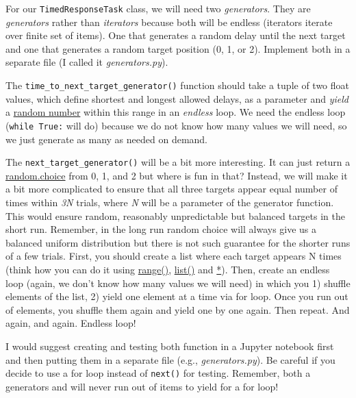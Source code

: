 \documentclass[
]{book}
\begin{document}
For our \texttt{TimedResponseTask} class, we will need two \emph{generators}. They are \emph{generators} rather than \emph{iterators} because both will be endless (iterators iterate over finite set of items). One that generates a random delay until the next target and one that generates a random target position (0, 1, or 2). Implement both in a separate file (I called it \emph{generators.py}).

The \texttt{time\_to\_next\_target\_generator()} function should take a tuple of two float values, which define shortest and longest allowed delays, as a parameter and \emph{yield} a \href{https://docs.python.org/3/library/random.html\#random.uniform}{random number} within this range in an \emph{endless} loop. We need the endless loop (\texttt{while\ True:} will do) because we do not know how many values we will need, so we just generate as many as needed on demand.

The \texttt{next\_target\_generator()} will be a bit more interesting. It can just return a \href{https://docs.python.org/3/library/random.html\#random.choice}{random.choice} from 0, 1, and 2 but where is fun in that? Instead, we will make it a bit more complicated to ensure that all three targets appear equal number of times within \emph{3N} trials, where \emph{N} will be a parameter of the generator function. This would ensure random, reasonably unpredictable but balanced targets in the short run. Remember, in the long run random choice will always give us a balanced uniform distribution but there is not such guarantee for the shorter runs of a few trials. First, you should create a list where each target appears N times (think how you can do it using \href{https://docs.python.org/3/library/functions.html\#func-range}{range()}, \href{https://docs.python.org/3/library/functions.html\#func-list}{list()} and \href{https://docs.python.org/3/library/stdtypes.html\#common-sequence-operations}{*}). Then, create an endless loop (again, we don't know how many values we will need) in which you 1) shuffle elements of the list, 2) yield one element at a time via for loop. Once you run out of elements, you shuffle them again and yield one by one again. Then repeat. And again, and again. Endless loop!

I would suggest creating and testing both function in a Jupyter notebook first and then putting them in a separate file (e.g., \emph{generators.py}). Be careful if you decide to use a for loop instead of \texttt{next()} for testing. Remember, both a generators and will never run out of items to yield for a for loop!
\end{document}
